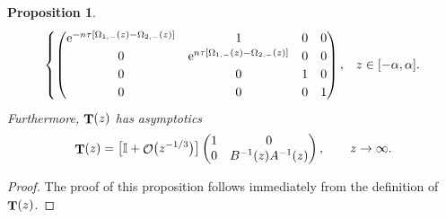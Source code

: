 \documentclass[10pt,a4paper]{amsart}
\DeclareMathOperator{\OO}{\mathcal{O}}
\DeclareMathOperator{\TT}{{\bf T}}
\numberwithin{equation}{section}
\newtheorem{Proposition}[Theorem]{Proposition}
 { \theoremstyle{definition}
\newtheorem{Definition}[Theorem]{Definition}
\newtheorem{Note}[Theorem]{Note}
\newtheorem{Example}[Theorem]{Example}
\newtheorem{Remark}[Theorem]{Remark} }
\begin{document}
\begin{Proposition}
\begin{equation*}
\begin{cases}
 \begin{pmatrix}
 {\rm e}^{-n\tau[\Omega_{1,-}(z)-\Omega_{2,-}(z)]} & 1 & 0 & 0 \\
 0 & {\rm e}^{n\tau[\Omega_{1,-}(z)-\Omega_{2,-}(z)]} & 0 & 0\\
 0 & 0 & 1 & 0 \\
 0 & 0 & 0 & 1
 \end{pmatrix},
 & z\in [-\alpha,\alpha].
 \end{cases}
 \end{equation*}
 Furthermore, $\TT(z)$ has asymptotics
\begin{equation*}%
 \TT(z) =
 \bigl[\mathbb{I} + \OO \bigl(z^{-1/3}\bigr)\bigr]
 \begin{pmatrix}
 1 & 0\\
 0 & B^{-1}(z) A^{-1}(z)
 \end{pmatrix}, \qquad z\to \infty.
\end{equation*}
 \end{Proposition}
\begin{proof}
 The proof of this proposition follows immediately from the definition of $\TT(z)$.
\end{proof}
\end{document}
